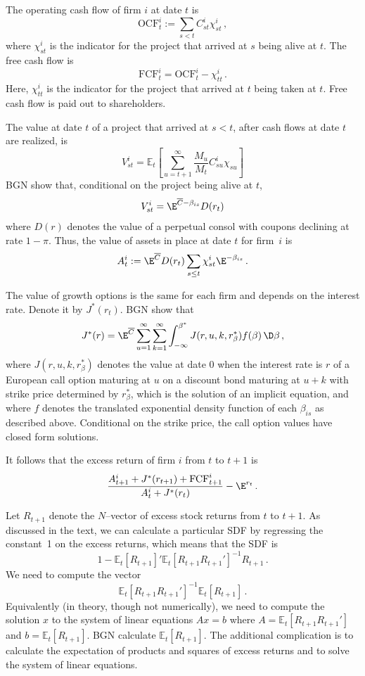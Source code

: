 \begin{appendices}
The operating cash flow of firm $i$ at date $t$ is
$$\text{OCF}^i_t :=\sum_{s<t} C^{i}_{st}\chi^i_{st}\,,$$
where $\chi^i_{st}$ is the indicator for the project that arrived at $s$ being alive at $t$.
The free cash flow is 
$$\text{FCF}^i_t = \text{OCF}^i_t - \chi^i_{tt}\,.$$
Here, $\chi^i_{tt}$ is the indicator for the project that arrived at $t$ being taken at $t$.  Free cash flow is paid out to shareholders.

The value at date $t$ of a project that arrived at $s<t$, after cash flows at date $t$ are realized, is
$$V_{st}^i = \mathbb{E}_t \left[\sum_{u=t+1}^\infty \frac{M_u}{M_t}C_{su}^i \chi_{su}\right]$$
BGN show that, conditional on the project being alive at $t$, 
$$V_{st}^i = \E^{\overline{C} - \beta_{is}}D(r_t)$$
where $D(r)$ denotes the value of a perpetual consol with coupons declining at rate $1-\pi$.  Thus, the value of assets in place at date $t$ for firm~$i$ is
$$A^i_t :=\E^{\overline{C}}D(r_t)\sum_{s\le t}\chi^i_{st}\E^{-\beta_{is}}\,.$$

The value of growth options is the same for each firm and depends on the interest rate.  Denote it by $J^*(r_t)$.  BGN show that 
\begin{equation}
J^*(r) = \E^{\overline{C}}\sum_{u=1}^\infty \sum_{k=1}^\infty \int_{-\infty}^{\beta^*} J(r, u, k, r^*_{\beta})f(\beta)\,\D \beta\,,
\end{equation}
where $J(r, u, k, r^*_\beta)$ denotes the value at date 0 when the interest rate is $r$ of a European call option maturing at $u$ on a discount bond maturing at $u+k$ with strike price determined by $r^*_\beta$, which is the solution of an implicit equation, and where $f$ denotes the translated exponential density function of each $\beta_{is}$ as described above.  Conditional on the strike price, the call option values have closed form solutions. 

It follows that the excess return of firm $i$ from $t$ to $t+1$ is 
\begin{equation}
\frac{A^i_{t+1} + J^*(r_{t+1}) + \text{FCF}^i_{t+1}}{A^i_t + J^*(r_t)} - \E^{r_t}\,.
\end{equation}

Let $R_{t+1}$ denote the $N$--vector of excess stock returns from $t$ to $t+1$.  As discussed in the text, we can calculate a particular SDF by regressing the constant~1 on the excess returns, which means that the SDF is
$$1 - \mathbb{E}_t[R_{t+1}]'\mathbb{E}_t[R_{t+1}R_{t+1}']^{-1}R_{t+1}\,.$$
We need to compute the vector
$$\mathbb{E}_t[R_{t+1}R_{t+1}']^{-1}\mathbb{E}_t[R_{t+1}]\,.$$
Equivalently (in theory, though not numerically), we need to compute the solution $x$ to the system of linear equations $Ax=b$ where $A=\mathbb{E}_t[R_{t+1}R_{t+1}']$ and $b = \mathbb{E}_t[R_{t+1}]$.
BGN calculate $\mathbb{E}_t[R_{t+1}]$.  The additional complication is to calculate the expectation of products and squares of excess returns and to solve the system of linear equations.


\end{appendices}
